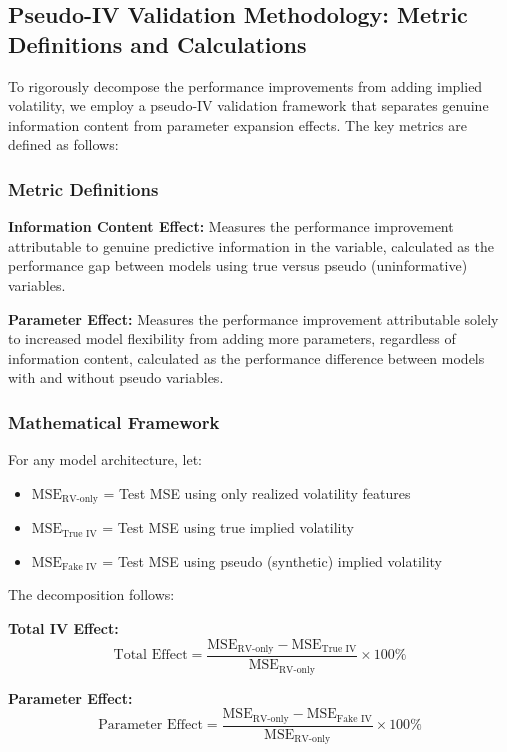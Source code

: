 \documentclass[12pt,a4paper]{article}
\begin{document}
\subsection{Pseudo-IV Validation Methodology: Metric Definitions and Calculations}

To rigorously decompose the performance improvements from adding implied volatility, we employ a pseudo-IV validation framework that separates genuine information content from parameter expansion effects. The key metrics are defined as follows:

\subsubsection{Metric Definitions}

\textbf{Information Content Effect:} Measures the performance improvement attributable to genuine predictive information in the variable, calculated as the performance gap between models using true versus pseudo (uninformative) variables.

\textbf{Parameter Effect:} Measures the performance improvement attributable solely to increased model flexibility from adding more parameters, regardless of information content, calculated as the performance difference between models with and without pseudo variables.

\subsubsection{Mathematical Framework}

For any model architecture, let:
\begin{itemize}
\item $\text{MSE}_{\text{RV-only}}$ = Test MSE using only realized volatility features
\item $\text{MSE}_{\text{True IV}}$ = Test MSE using true implied volatility
\item $\text{MSE}_{\text{Fake IV}}$ = Test MSE using pseudo (synthetic) implied volatility
\end{itemize}

The decomposition follows:

\textbf{Total IV Effect:}
$$\text{Total Effect} = \frac{\text{MSE}_{\text{RV-only}} - \text{MSE}_{\text{True IV}}}{\text{MSE}_{\text{RV-only}}} \times 100\%$$

\textbf{Parameter Effect:}
$$\text{Parameter Effect} = \frac{\text{MSE}_{\text{RV-only}} - \text{MSE}_{\text{Fake IV}}}{\text{MSE}_{\text{RV-only}}} \times 100\%$$
\end{document}
